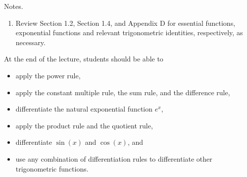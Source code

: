 \documentclass[../main]{subfiles}
\begin{document}
%
%
Notes.
  \begin{enumerate}
    \item Review Section 1.2, Section 1.4, and Appendix D for essential functions, exponential functions and relevant trigonometric identities, respectively, as necessary.
  \end{enumerate}




%
%

  At the end of the lecture, students should be able to
  \begin{itemize}
    \item apply the power rule, 
    \item apply the constant multiple rule, the sum rule, and the difference rule, 
    \item differentiate the natural exponential function \(e^{x}\), 
    \item apply the product rule and the quotient rule,
    \item differentiate \(\sin(x)\) and \(\cos(x)\), and
    \item use any combination of differentiation rules to differentiate other trigonometric functions.
  \end{itemize}




%
%
%
\end{document}

